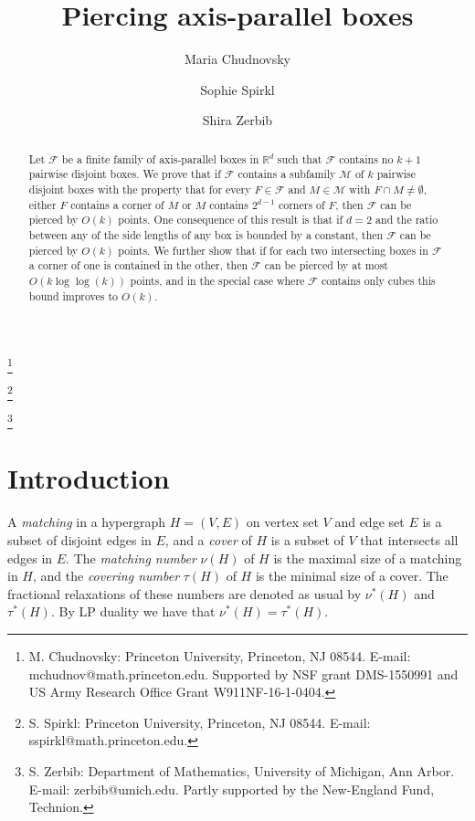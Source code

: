 \documentclass[12pt]{amsart}
\theoremstyle{plain}
\theoremstyle{definition}
\theoremstyle{remark}
\newcommand{\F}{\mathcal{F}}
\newcommand{\M}{\mathcal{M}}
\newcommand{\R}{\mathbb{R}}
\begin{document}
\title{Piercing axis-parallel boxes}
\author{Maria Chudnovsky}\thanks{M. Chudnovsky:
Princeton University, Princeton, NJ 08544. E-mail: mchudnov@math.princeton.edu. Supported by NSF grant DMS-1550991 and US Army Research Office Grant W911NF-16-1-0404.}
\author{Sophie Spirkl}\thanks{S. Spirkl:
Princeton University, Princeton, NJ 08544. E-mail: sspirkl@math.princeton.edu.}
\author{Shira Zerbib}\thanks{S. Zerbib: Department of Mathematics,
University of Michigan, Ann Arbor. E-mail: zerbib@umich.edu. Partly supported by the New-England Fund, Technion.}


\begin{abstract}
Let $\F$ be a finite family of axis-parallel boxes in $\R^d$ such that $\F$ contains no $k+1$ pairwise disjoint boxes.
We prove that if $\F$ contains a subfamily $\M$ of $k$ pairwise disjoint boxes with the property that for every $F\in \F$ and $M\in \M$ with $F \cap M \neq \emptyset$, either 
$F$ contains a corner of $M$ or 
$M$ contains $2^{d-1}$ corners of $F$, then $\F$ can be pierced by $O(k)$ points. One consequence of this result is that if $d=2$ and the ratio between any of the side lengths of any box is bounded by a constant, then $\F$ can be pierced by $O(k)$ points.        
We further show that if  
for each two intersecting boxes in $\F$ a corner of one is contained in the other, then $\F$ can be pierced by at most $O(k\log\log(k))$ points, and in the special case where $\F$ contains only cubes this bound improves to $O(k)$.  
\end{abstract}

\maketitle

\section{Introduction}
A \emph{matching} in a hypergraph $H=(V,E)$ on  vertex set $V$ and edge set $E$ is a subset of disjoint edges in $E$, and a \emph{cover} of $H$ is a subset of $V$ that intersects all edges in $E$. The \emph{matching number} $\nu(H)$ of $H$ is the maximal size of a matching in $H$, and the \emph{covering number} $\tau(H)$ of $H$ is the minimal size of a cover. The fractional relaxations of these numbers are denoted as usual by $\nu^*(H)$ and $\tau^*(H)$. By LP duality we have that $\nu^*(H)=\tau^*(H)$.  
\end{document}
